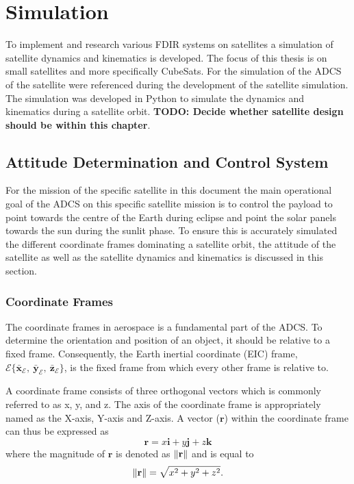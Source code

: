 \chapter{Simulation}
\label{chap:Simulation}

To implement and research various FDIR systems on satellites a simulation of satellite dynamics and kinematics is developed. The focus of this thesis is on small satellites and more specifically CubeSats. For the simulation of the ADCS of the satellite \cite{auret2012design, JansevanVuuren2015, Jordaan2016} were referenced during the development of the satellite simulation. The simulation was developed in Python to simulate the dynamics and kinematics during a satellite orbit. \textbf{TODO: Decide whether satellite design should be within this chapter}.

\section{Attitude Determination and Control System}

For the mission of the specific satellite in this document the main operational goal of the ADCS on this specific satellite mission is to control the payload to point towards the centre of the Earth during eclipse and point the solar panels towards the sun during the sunlit phase. To ensure this is accurately simulated the different coordinate frames dominating a satellite orbit, the attitude of the satellite as well as the satellite dynamics and kinematics is discussed in this section.

\subsection{Coordinate Frames}
The coordinate frames in aerospace is a fundamental part of the ADCS. To determine the orientation and position of an object, it should be relative to a fixed frame. Consequently, the Earth inertial coordinate (EIC) frame, $\mathcal{E}\{\bar{\mathbf{x}}_{\mathcal{E}},~\bar{\mathbf{y}}_{\mathcal{E}},~\bar{\mathbf{z}}_{\mathcal{E}}\}$, is the fixed frame from which every other frame is relative to.

A coordinate frame consists of three orthogonal vectors which is commonly referred to as x, y, and z. The axis of the coordinate frame is appropriately named as the X-axis, Y-axis and Z-axis. A vector ($\mathbf{r}$) within the coordinate frame can thus be expressed as 
\begin{equation}
\mathbf{r} = x\mathbf{i} + y\mathbf{j} + z\mathbf{k}
\end{equation}
where the magnitude of $\mathbf{r}$ is denoted as $\left\lVert\mathbf{r}\right\rVert$ and is equal to 
\begin{equation}
\left\lVert\mathbf{r}\right\rVert = \sqrt{x^2 + y^2 + z^2}.
\end{equation}

